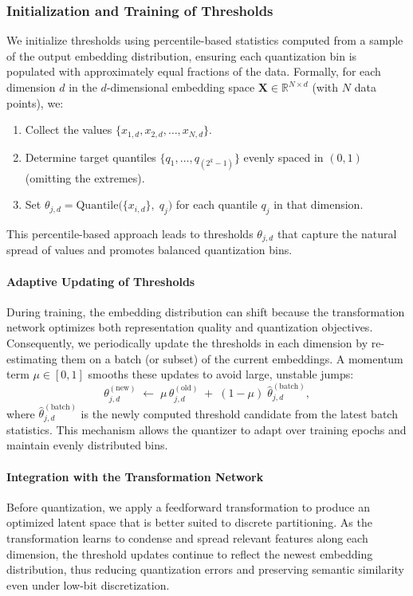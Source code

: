 \subsubsection{Initialization and Training of Thresholds}
We initialize thresholds using percentile-based statistics computed from a sample of the output embedding distribution, ensuring each quantization bin is populated with approximately equal fractions of the data. Formally, for each dimension $d$ in the $d$-dimensional embedding space $\mathbf{X} \in \mathbb{R}^{N \times d}$ (with $N$ data points), we:
\begin{enumerate}
    \item Collect the values $\{ x_{1,d}, x_{2,d}, \dots, x_{N,d} \}$.
    \item Determine target quantiles $\{q_1,\dots,q_{(2^k-1)}\}$ evenly spaced in $(0,1)$ (omitting the extremes).
    \item Set $\theta_{j,d} = \text{Quantile}\bigl(\{ x_{i,d} \},\; q_j\bigr)$ for each quantile $q_j$ in that dimension.
\end{enumerate}
This percentile-based approach leads to thresholds $\theta_{j,d}$ that capture the natural spread of values and promotes balanced quantization bins.

\paragraph{Adaptive Updating of Thresholds}
During training, the embedding distribution can shift because the transformation network optimizes both representation quality and quantization objectives. Consequently, we periodically update the thresholds in each dimension by re-estimating them on a batch (or subset) of the current embeddings. A momentum term $\mu \in [0,1]$ smooths these updates to avoid large, unstable jumps:
\[
\theta_{j,d}^{(\text{new})} \;\leftarrow\; \mu\,\theta_{j,d}^{(\text{old})} \;+\;(1-\mu)\;\widehat{\theta}_{j,d}^{(\text{batch})},
\]
where $\widehat{\theta}_{j,d}^{(\text{batch})}$ is the newly computed threshold candidate from the latest batch statistics. This mechanism allows the quantizer to adapt over training epochs and maintain evenly distributed bins.

\paragraph{Integration with the Transformation Network}
Before quantization, we apply a feedforward transformation to produce an optimized latent space that is better suited to discrete partitioning. As the transformation learns to condense and spread relevant features along each dimension, the threshold updates continue to reflect the newest embedding distribution, thus reducing quantization errors and preserving semantic similarity even under low-bit discretization.

